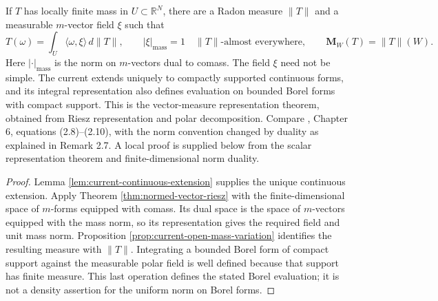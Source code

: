 \begin{theorem}\label{thm:current-mass-representation}
If $T$ has locally finite mass in $U\subset\mathbb R^N$, there are a Radon measure $\|T\|$ and a measurable $m$-vector field $\xi$ such that
\[
 T(\omega)=\int_U\langle\omega,\xi\rangle\,d\|T\|,
 \qquad |\xi|_{\mathrm{mass}}=1\quad\|T\|\text{-almost everywhere},
 \qquad \mathbf M_W(T)=\|T\|(W).
\]
Here $|\cdot|_{\mathrm{mass}}$ is the norm on $m$-vectors dual to comass. The field $\xi$ need not be simple. The current extends uniquely to compactly supported continuous forms, and its integral representation also defines evaluation on bounded Borel forms with compact support. This is the vector-measure representation theorem, obtained from Riesz representation and polar decomposition. Compare \cite{Sim18}, Chapter 6, equations (2.8)--(2.10), with the norm convention changed by duality as explained in Remark 2.7. A local proof is supplied below from the scalar representation theorem and finite-dimensional norm duality.
\end{theorem}
\begin{proof}
Lemma \ref{lem:current-continuous-extension} supplies the unique continuous extension. Apply Theorem \ref{thm:normed-vector-riesz} with the finite-dimensional space of $m$-forms equipped with comass. Its dual space is the space of $m$-vectors equipped with the mass norm, so its representation gives the required field and unit mass norm. Proposition \ref{prop:current-open-mass-variation} identifies the resulting measure with $\|T\|$. Integrating a bounded Borel form of compact support against the measurable polar field is well defined because that support has finite measure. This last operation defines the stated Borel evaluation; it is not a density assertion for the uniform norm on Borel forms.
\end{proof}

